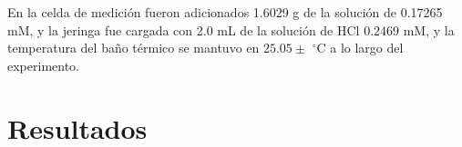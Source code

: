 	En la celda de medición fueron adicionados 1.6029 g de la solución de  0.17265 mM, y la jeringa fue cargada con 2.0 mL de la soluci\'on de HCl 0.2469 mM, y la temperatura del ba\~no t\'ermico se mantuvo en $25.05 \pm $ $^\circ$C a lo largo del experimento. 
\section{Resultados}


		
